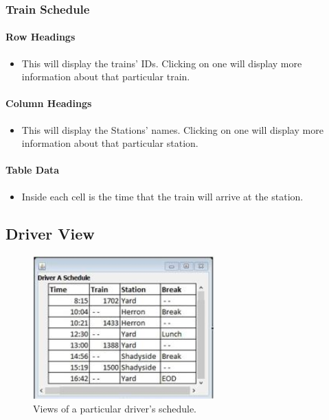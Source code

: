 \documentclass[letterpaper]{article}
\begin{document}
	\subsubsection{Train Schedule}
		\paragraph{Row Headings}
			\begin{itemize}
				\item This will display the trains' IDs. Clicking on one will display more information about that particular train.
			\end{itemize}
		\paragraph{Column Headings}
			\begin{itemize}
				\item This will display the Stations' names. Clicking on one will display more information about that particular station.
			\end{itemize}
		\paragraph{Table Data}
			\begin{itemize}
				\item Inside each cell is the time that the train will arrive at the station.
			\end{itemize}

\subsection{Driver View}

\begin{figure}[h!]
	\center
	\includegraphics[width=7cm]{driver_view}
	\caption{Views of a particular driver's schedule.}
\end{figure}
\end{document}
